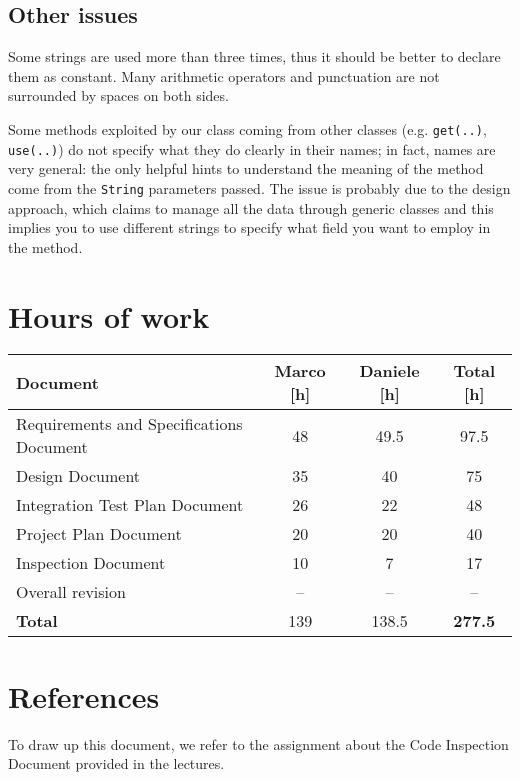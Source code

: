 \documentclass{scrreprt}
\begin{document}
\section{Other issues}
\label{otherissues}
Some strings are used more than three times, thus it should be better to declare them as constant.
Many arithmetic operators and punctuation are not surrounded by spaces on both sides.

Some methods exploited by our class coming from other classes (e.g. \texttt{get(..)}, \texttt{use(..)}) do not specify what they do clearly in their names; in fact, names are very general: the only helpful hints to understand the meaning of the method come from the \texttt{String} parameters passed.
The issue is probably due to the design approach, which claims to manage all the data through generic classes and this implies you to use different strings to specify what field you want to employ in the method.


\chapter{Hours of work}

\begin{center}
    \begin{tabularx}{\columnwidth}{Xccc}
        \toprule
	   \textbf{Document} & \textbf{Marco [h]}& \textbf{Daniele [h]} &\textbf{Total [h]}\\
	   \midrule
        Requirements and Specifications Document&48&49.5&97.5\\ 
        Design Document &35&40&75\\   
        Integration Test Plan Document &26&22&48\\    
        Project Plan Document &20&20&40\\   
        Inspection Document &10&7&17\\   
        Overall revision & -- & -- & --\\  
        
        \midrule
        
        \textbf{Total} & 139 & 138.5 & \textbf {277.5}\\
        
	\bottomrule
    \end{tabularx}
\end{center}
\chapter{References}
To draw up this document, we refer to the assignment about the Code Inspection Document provided in the lectures.
\end{document}
